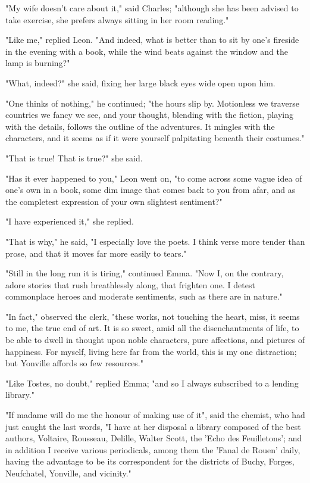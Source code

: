 \documentclass[11pt,twocolumn]{ltugboat}
\begin{document}
"My wife doesn't care about it," said Charles; "although she has
been advised to take exercise, she prefers always sitting in her room
reading."

"Like me," replied Leon. "And indeed, what is better than to sit by
one's fireside in the evening with a book, while the wind beats against
the window and the lamp is burning?"

"What, indeed?" she said, fixing her large black eyes wide open upon
him.

"One thinks of nothing," he continued; "the hours slip by. Motionless we
traverse countries we fancy we see, and your thought, blending with
the fiction, playing with the details, follows the outline of the
adventures. It mingles with the characters, and it seems as if it were
yourself palpitating beneath their costumes."

"That is true! That is true?" she said.

"Has it ever happened to you," Leon went on, "to come across some vague
idea of one's own in a book, some dim image that comes back to you from
afar, and as the completest expression of your own slightest sentiment?"

"I have experienced it," she replied.

"That is why," he said, "I especially love the poets. I think verse more
tender than prose, and that it moves far more easily to tears."

"Still in the long run it is tiring," continued Emma. "Now I, on the
contrary, adore stories that rush breathlessly along, that frighten one.
I detest commonplace heroes and moderate sentiments, such as there are
in nature."

"In fact," observed the clerk, "these works, not touching the heart,
miss, it seems to me, the true end of art. It is so sweet, amid all
the disenchantments of life, to be able to dwell in thought upon noble
characters, pure affections, and pictures of happiness. For myself,
living here far from the world, this is my one distraction; but Yonville
affords so few resources."

"Like Tostes, no doubt," replied Emma; "and so I always subscribed to a
lending library."

"If madame will do me the honour of making use of it", said the chemist,
who had just caught the last words, "I have at her disposal a library
composed of the best authors, Voltaire, Rousseau, Delille, Walter
Scott, the 'Echo des Feuilletons'; and in addition I receive various
periodicals, among them the 'Fanal de Rouen' daily, having the advantage
to be its correspondent for the districts of Buchy, Forges, Neufchatel,
Yonville, and vicinity."
\end{document}
